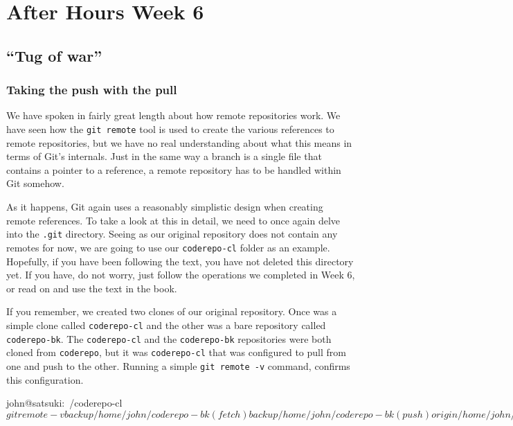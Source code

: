 \chapter{After Hours Week 6}
\section{``Tug of war''}
\subsection{Taking the push with the pull}

We have spoken in fairly great length about how remote repositories work.
We have seen how the \texttt{git remote} tool is used to create the various references to remote repositories, but we have no real understanding about what this means in terms of Git's internals.
Just in the same way a branch is a single file that contains a pointer to a reference, a remote repository has to be handled within Git somehow.

As it happens, Git again uses a reasonably simplistic design when creating remote references.
To take a look at this in detail, we need to once again delve into the \texttt{.git} directory.
Seeing as our original repository does not contain any remotes for now, we are going to use our \texttt{coderepo-cl} folder as an example.
Hopefully, if you have been following the text, you have not deleted this directory yet.
If you have, do not worry, just follow the operations we completed in Week 6, or read on and use the text in the book.

If you remember, we created two clones of our original repository.
Once was a simple clone called \texttt{coderepo-cl} and the other was a bare repository called \texttt{coderepo-bk}.
The \texttt{coderepo-cl} and the \texttt{coderepo-bk} repositories were both cloned from \texttt{coderepo}, but it was \texttt{coderepo-cl} that was configured to pull from one and push to the other.
Running a simple \texttt{git remote -v} command, confirms this configuration.

\begin{code}
john@satsuki:~/coderepo-cl$ git remote -v
backup	/home/john/coderepo-bk (fetch)
backup	/home/john/coderepo-bk (push)
origin	/home/john/coderepo (fetch)
origin	/home/john/coderepo (push)
john@satsuki:~/coderepo-cl$
\end{code}

